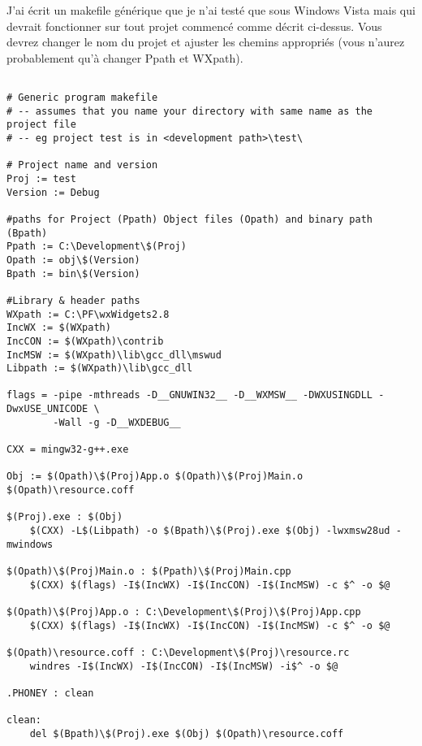 J'ai écrit un makefile générique que je n'ai testé que sous Windows Vista mais qui devrait fonctionner sur tout projet commencé comme décrit ci-dessus. Vous devrez changer le nom du projet et ajuster les chemins appropriés (vous n'aurez probablement qu'à changer Ppath et WXpath).

\begin{verbatim}  

# Generic program makefile
# -- assumes that you name your directory with same name as the project file
# -- eg project test is in <development path>\test\

# Project name and version
Proj := test
Version := Debug

#paths for Project (Ppath) Object files (Opath) and binary path (Bpath)
Ppath := C:\Development\$(Proj)
Opath := obj\$(Version)
Bpath := bin\$(Version)

#Library & header paths
WXpath := C:\PF\wxWidgets2.8
IncWX := $(WXpath)
IncCON := $(WXpath)\contrib
IncMSW := $(WXpath)\lib\gcc_dll\mswud
Libpath := $(WXpath)\lib\gcc_dll

flags = -pipe -mthreads -D__GNUWIN32__ -D__WXMSW__ -DWXUSINGDLL -DwxUSE_UNICODE \ 
        -Wall -g -D__WXDEBUG__

CXX = mingw32-g++.exe

Obj := $(Opath)\$(Proj)App.o $(Opath)\$(Proj)Main.o $(Opath)\resource.coff

$(Proj).exe : $(Obj)
    $(CXX) -L$(Libpath) -o $(Bpath)\$(Proj).exe $(Obj) -lwxmsw28ud -mwindows

$(Opath)\$(Proj)Main.o : $(Ppath)\$(Proj)Main.cpp
    $(CXX) $(flags) -I$(IncWX) -I$(IncCON) -I$(IncMSW) -c $^ -o $@

$(Opath)\$(Proj)App.o : C:\Development\$(Proj)\$(Proj)App.cpp
    $(CXX) $(flags) -I$(IncWX) -I$(IncCON) -I$(IncMSW) -c $^ -o $@

$(Opath)\resource.coff : C:\Development\$(Proj)\resource.rc
    windres -I$(IncWX) -I$(IncCON) -I$(IncMSW) -i$^ -o $@

.PHONEY : clean

clean:
    del $(Bpath)\$(Proj).exe $(Obj) $(Opath)\resource.coff
\end{verbatim}


